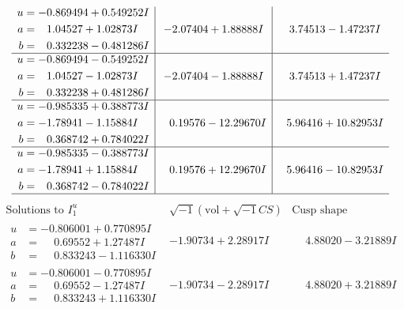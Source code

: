 \documentclass[1p]{elsarticle_modified}
\theoremstyle{definition}
\newcommand{\I}{\sqrt{-1}}
\begin{document}
$$\begin{array}{c|c|c}
\begin{aligned}
u &= -0.869494 + 0.549252 I \\
a &= \phantom{-}1.04527 + 1.02873 I \\
b &= \phantom{-}0.332238 - 0.481286 I\end{aligned}
 & -2.07404 + 1.88888 I & \phantom{-}3.74513 - 1.47237 I \\ \hline\begin{aligned}
u &= -0.869494 - 0.549252 I \\
a &= \phantom{-}1.04527 - 1.02873 I \\
b &= \phantom{-}0.332238 + 0.481286 I\end{aligned}
 & -2.07404 - 1.88888 I & \phantom{-}3.74513 + 1.47237 I \\ \hline\begin{aligned}
u &= -0.985335 + 0.388773 I \\
a &= -1.78941 - 1.15884 I \\
b &= \phantom{-}0.368742 + 0.784022 I\end{aligned}
 & \phantom{-}0.19576 - 12.29670 I & \phantom{-}5.96416 + 10.82953 I \\ \hline\begin{aligned}
u &= -0.985335 - 0.388773 I \\
a &= -1.78941 + 1.15884 I \\
b &= \phantom{-}0.368742 - 0.784022 I\end{aligned}
 & \phantom{-}0.19576 + 12.29670 I & \phantom{-}5.96416 - 10.82953 I\\
 \hline 
 \end{array}$$\newpage$$\begin{array}{c|c|c}  
\text{Solutions to }I^u_{1}& \I (\text{vol} + \sqrt{-1}CS) & \text{Cusp shape}\\
 \hline 
\begin{aligned}
u &= -0.806001 + 0.770895 I \\
a &= \phantom{-}0.69552 + 1.27487 I \\
b &= \phantom{-}0.833243 - 1.116330 I\end{aligned}
 & -1.90734 + 2.28917 I & \phantom{-}4.88020 - 3.21889 I \\ \hline\begin{aligned}
u &= -0.806001 - 0.770895 I \\
a &= \phantom{-}0.69552 - 1.27487 I \\
b &= \phantom{-}0.833243 + 1.116330 I\end{aligned}
 & -1.90734 - 2.28917 I & \phantom{-}4.88020 + 3.21889 I \\ \hline\begin{aligned}

\end{aligned}
\end{array}$$
\end{document}
